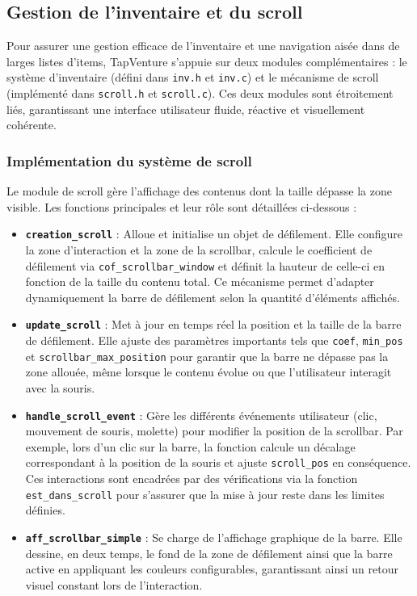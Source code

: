 \documentclass[11pt,a4paper]{article}
\begin{document}
\subsection{Gestion de l'inventaire et du scroll}

Pour assurer une gestion efficace de l'inventaire et une navigation aisée dans de larges listes d'items, TapVenture s'appuie sur deux modules complémentaires : le système d'inventaire (défini dans \texttt{inv.h} et \texttt{inv.c}) et le mécanisme de scroll (implémenté dans \texttt{scroll.h} et \texttt{scroll.c}). Ces deux modules sont étroitement liés, garantissant une interface utilisateur fluide, réactive et visuellement cohérente.

\subsubsection{Implémentation du système de scroll}
Le module de scroll gère l'affichage des contenus dont la taille dépasse la zone visible. Les fonctions principales et leur rôle sont détaillées ci-dessous :
\begin{itemize}
    \item \textbf{\texttt{creation\_scroll}} : Alloue et initialise un objet de défilement. Elle configure la zone d'interaction et la zone de la scrollbar, calcule le coefficient de défilement via \texttt{cof\_scrollbar\_window} et définit la hauteur de celle-ci en fonction de la taille du contenu total. Ce mécanisme permet d'adapter dynamiquement la barre de défilement selon la quantité d'éléments affichés.
    \item \textbf{\texttt{update\_scroll}} : Met à jour en temps réel la position et la taille de la barre de défilement. Elle ajuste des paramètres importants tels que \texttt{coef}, \texttt{min\_pos} et \texttt{scrollbar\_max\_position} pour garantir que la barre ne dépasse pas la zone allouée, même lorsque le contenu évolue ou que l'utilisateur interagit avec la souris.
    \item \textbf{\texttt{handle\_scroll\_event}} : Gère les différents événements utilisateur (clic, mouvement de souris, molette) pour modifier la position de la scrollbar. Par exemple, lors d'un clic sur la barre, la fonction calcule un décalage correspondant à la position de la souris et ajuste \texttt{scroll\_pos} en conséquence. Ces interactions sont encadrées par des vérifications via la fonction \texttt{est\_dans\_scroll} pour s'assurer que la mise à jour reste dans les limites définies.
    \item \textbf{\texttt{aff\_scrollbar\_simple}} : Se charge de l'affichage graphique de la barre. Elle dessine, en deux temps, le fond de la zone de défilement ainsi que la barre active en appliquant les couleurs configurables, garantissant ainsi un retour visuel constant lors de l'interaction.
\end{itemize}
\end{document}
